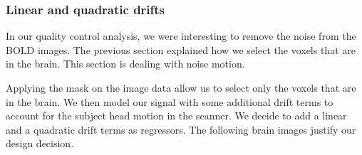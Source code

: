 \subsubsection{Linear and quadratic drifts}
\noindent
\par In our quality control analysis, we were interesting to remove the noise
from the BOLD images. The previous section explained how we select the voxels
that are in the brain. This section is dealing with noise motion. 

\noindent
\par Applying the mask on the image data allow us to select only the voxels that
are in the brain. 
We then model our signal with some additional drift terms to account for
the subject head motion in the scanner. We decide to add a linear and a 
quadratic drift terms as regressors. The following brain images justify
our design decision.

